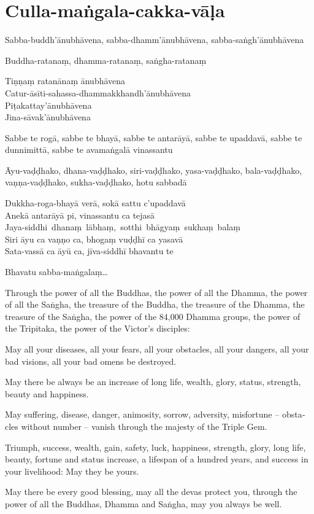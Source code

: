 \section{Culla-maṅgala-cakka-vāḷa}


\begin{paritta}

Sabba-buddh'ānubhāvena, sabba-dhamm'ānubhāvena, sabba-saṅgh'ānubhāvena

Buddha-ratanaṃ, dhamma-ratanaṃ, saṅgha-ratanaṃ

Tiṇṇaṃ ratanānaṃ ānubhāvena\\
Catur-āsīti-sahassa-dhammakkhandh'ānubhāvena\\
Piṭakattay'ānubhāvena\\
Jina-sāvak'ānubhāvena

Sabbe te rogā, sabbe te bhayā, sabbe te antarāyā, sabbe te upaddavā, sabbe te
dunnimittā, sabbe te avamaṅgalā vinassantu

Āyu-vaḍḍhako, dhana-vaḍḍhako, siri-vaḍḍhako, yasa-vaḍḍhako, bala-vaḍḍhako,
vaṇṇa-vaḍḍhako, sukha-vaḍḍhako, hotu sabbadā

Dukkha-roga-bhayā verā, sokā sattu c'upaddavā\\
Anekā antarāyā pi, vinassantu ca tejasā\\
\mbox{Jaya-siddhi dhanaṃ lābhaṃ, sotthi bhāgyaṃ sukhaṃ balaṃ}\\
Siri āyu ca vaṇṇo ca, bhogaṃ vuḍḍhī ca yasavā\\
Sata-vassā ca āyū ca, jīva-siddhī bhavantu te

Bhavatu sabba-maṅgalaṃ\ldots{}

\end{paritta}

\begin{english}
  Through the power of all the Buddhas, the power of all the Dhamma, the power of all the Saṅgha,
  the treasure of the Buddha, the treasure of the Dhamma, the treasure of the Saṅgha,
  the power of the 84,000 Dhamma groups, the power of the Tripitaka, the power
  of the Victor's disciples:

  May all your diseases, all your fears, all your obstacles,
  all your dangers, all your bad visions, all your bad omens be destroyed.

  May there be always be an increase of long life, wealth, glory, status,
  strength, beauty and happiness.

  May suffering, disease, danger, animosity, sorrow, adversity, misfortune --
  obstacles without number -- vanish through the majesty of the Triple Gem.

  Triumph, success, wealth, gain, safety, luck, happiness, strength, glory, long
  life, beauty, fortune and status increase, a lifespan of a hundred years, and
  success in your livelihood: May they be yours.

  May there be every good blessing, may all the devas protect you, through the
  power of all the Buddhas, Dhamma and Saṅgha, may you always be well.
\end{english}

